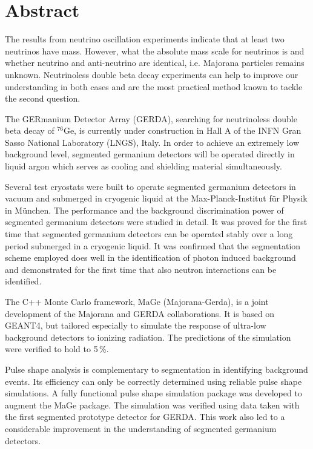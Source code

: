 \section*{Abstract} 
The results from neutrino oscillation experiments indicate that at
least two neutrinos have mass. However, what the absolute mass scale
for neutrinos is and whether neutrino and anti-neutrino are identical,
i.e. Majorana particles remains unknown.  Neutrinoless double beta
decay experiments can help to improve our understanding in both cases
and are the most practical method known to tackle the second question.
 
The GERmanium Detector Array (GERDA), searching for neutrinoless
double beta decay of $^{76}$Ge, is currently under construction in
Hall A of the INFN Gran Sasso National Laboratory (LNGS), Italy. In
order to achieve an extremely low background level, segmented
germanium detectors will be operated directly in liquid argon which
serves as cooling and shielding material simultaneously.
 
Several test cryostats were built to operate segmented germanium
detectors in vacuum and submerged in cryogenic liquid at the
Max-Planck-Institut f\"ur Physik in M\"unchen. The performance and the
background discrimination power of segmented germanium detectors were
studied in detail.  It was proved for the first time that segmented
germanium detectors can be operated stably over a long period
submerged in a cryogenic liquid.  It was confirmed that the
segmentation scheme employed does well in the identification of photon
induced background and demonstrated for the first time that also
neutron interactions can be identified.
 
 
The C++ Monte Carlo framework, MaGe (Majorana-Gerda), is a joint
development of the Majorana and GERDA collaborations.  It is based on
GEANT4, but tailored especially to simulate the response of ultra-low
background detectors to ionizing radiation.  The predictions of the
simulation were verified to hold to 5\,\%.
 
Pulse shape analysis is complementary to segmentation in identifying
background events.  Its efficiency can only be correctly determined
using reliable pulse shape simulations.  A fully functional pulse
shape simulation package was developed to augment the MaGe
package. The simulation was verified using data taken with the first
segmented prototype detector for GERDA. This work also led to a
considerable improvement in the understanding of segmented germanium
detectors.
 
